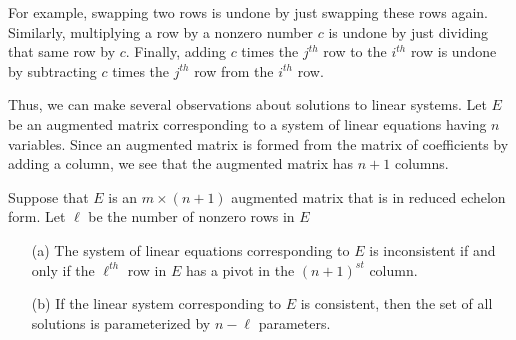 \documentclass{ximera}
\begin{document}
For example, swapping two rows is undone by just swapping these
rows again.  Similarly, multiplying a row by a nonzero number
$c$ is undone by just dividing that same row by $c$.  Finally,
adding $c$ times the $j^{th}$ row to the $i^{th}$ row is undone
by subtracting $c$ times the $j^{th}$ row from the $i^{th}$ row.

Thus, we can make several observations about solutions to linear
systems.  Let $E$ be an augmented matrix corresponding to a system
of linear equations having $n$ variables.  Since an augmented
matrix is formed from the matrix of coefficients by adding a
column, we see that the augmented matrix has $n+1$ columns.

\begin{thm} \label{number}
Suppose that $E$ is an $m\times(n+1)$ augmented matrix that is in 
reduced echelon form.  Let $\ell$ be the number of nonzero rows in $E$
\begin{enumerate}
\item[(a)] The system of linear equations corresponding to $E$
is inconsistent if and only if the $\ell^{th}$ row in $E$ has a
pivot in the $(n+1)^{st}$ column.
\item[(b)] If the linear system corresponding to $E$ is consistent,
then the set of all solutions is parameterized by $n-\ell$
parameters.
\end{enumerate}  
\end{thm}
\end{document}
